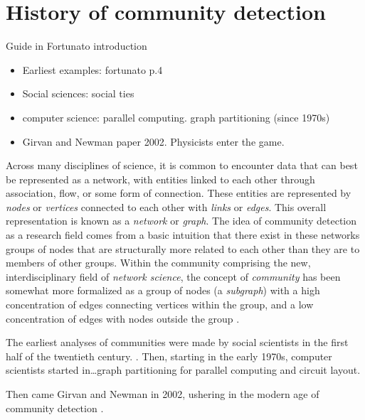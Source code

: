 \section{History of community
detection}\label{history-of-community-detection}

Guide in Fortunato introduction

\begin{itemize}
\tightlist
\item
  Earliest examples: fortunato p.4
\item
  Social sciences: social ties
\item
  computer science: parallel computing. graph partitioning (since 1970s)
\item
  Girvan and Newman paper 2002. Physicists enter the game.
\end{itemize}

Across many disciplines of science, it is common to encounter data that
can best be represented as a network, with entities linked to each other
through association, flow, or some form of connection. These entities
are represented by \emph{nodes} or \emph{vertices} connected to each
other with \emph{links} or \emph{edges}. This overall representation is
known as a \emph{network} or \emph{graph}. The idea of community
detection as a research field comes from a basic intuition that there
exist in these networks groups of nodes that are structurally more
related to each other than they are to members of other groups. Within
the community comprising the new, interdisciplinary field of
\emph{network science}, the concept of \emph{community} has been
somewhat more formalized as a group of nodes (a \emph{subgraph}) with a
high concentration of edges connecting vertices within the group, and a
low concentration of edges with nodes outside the group
\autocite{fortunato_community_2010}.

The earliest analyses of communities were made by social scientists in
the first half of the twentieth century. . Then, starting
in the early 1970s, computer scientists started in\ldots{}graph
partitioning for parallel computing and circuit layout.

Then came Girvan and Newman in 2002, ushering in the modern age of
community detection \autocite{lancichinetti_community_2009}.

